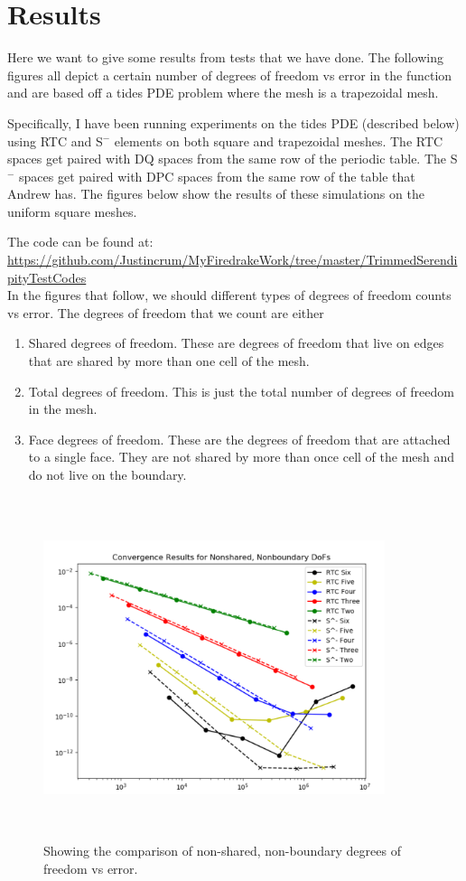 \documentclass[12pt]{extarticle}
\newcommand{\<}{\langle}
\renewcommand{\>}{\rangle}
\theoremstyle{definition}
\begin{document}
\section{Results}

Here we want to give some results from tests that we have done.  The following figures all depict a certain number of degrees of freedom vs error in the function and are based off a tides PDE problem where the mesh is a trapezoidal mesh.

Specifically, I have been running experiments on the tides PDE (described below) using RTC and S$^-$ elements on both square and trapezoidal meshes.  The RTC spaces get paired with DQ spaces from the same row of the periodic table.  The S$^-$ spaces get paired with DPC spaces from the same row of the table that Andrew has.  The figures below show the results of these simulations on the uniform square meshes.  

The code can be found at:\\


\noindent \url{https://github.com/Justincrum/MyFiredrakeWork/tree/master/TrimmedSerendipityTestCodes}\\


In the figures that follow, we should different types of degrees of freedom counts vs error.  The degrees of freedom that we count are either
\begin{enumerate}
    \item Shared degrees of freedom.  These are degrees of freedom that live on edges that are shared by more than one cell of the mesh.
    \item Total degrees of freedom.  This is just the total number of degrees of freedom in the mesh.
    \item Face degrees of freedom.  These are the degrees of freedom that are attached to a single face.  They are not shared by more than once cell of the mesh and do not live on the boundary.
\end{enumerate}


\begin{figure}
    \centering
    \includegraphics[width=10cm,height=10cm]{FaceDoFs.PNG}
    \caption{Showing the comparison of non-shared, non-boundary degrees of freedom vs error.}
    \label{fig:nonshared}
\end{figure}
\end{document}
